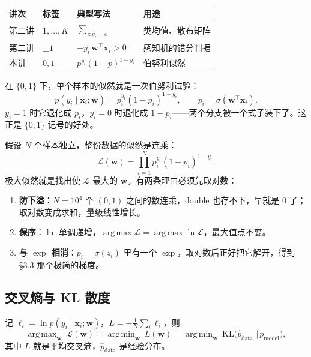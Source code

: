 \documentclass[11pt,a4paper,fontset=windows,zihao=-4]{ctexart}
\newcommand{\bw}{\mathbf{w}}
\newcommand{\bx}{\mathbf{x}}
\newcommand{\tp}{^{\top}}
\DeclareMathOperator*{\argmin}{arg\,min}
\DeclareMathOperator*{\argmax}{arg\,max}
\newcommand{\tabhead}{\sffamily\bfseries\color{navy}}
\begin{document}
\begin{center}
\small
\begin{tabular}{@{}llll@{}}
\toprule
\rowcolor{navy!7}
\tabhead 讲次 & \tabhead 标签 & \tabhead 典型写法 & \tabhead 用途\\
\midrule
第二讲 & $1,\dots,K$ & $\sum_{i:y_i=c}$ & 类均值、散布矩阵\\
第二讲 & $\pm1$ & $-y_i\,\bw\tp\bx_i>0$ & 感知机的错分判据\\
本讲 & $0,1$ & $p^{y_i}(1-p)^{1-y_i}$ & 伯努利似然\\
\bottomrule
\end{tabular}
\end{center}

在 $\{0,1\}$ 下，单个样本的似然就是一次伯努利试验：
\begin{equation}
  p(y_i\mid\bx_i;\bw)=p_i^{y_i}(1-p_i)^{1-y_i},\qquad p_i=\sigma(\bw\tp\bx_i).
  \label{eq:like}
\end{equation}
$y_i=1$ 时它退化成 $p_i$，$y_i=0$ 时退化成 $1-p_i$——两个分支被一个式子装下了。这正是 $\{0,1\}$ 记号的好处。

假设 $N$ 个样本独立，整份数据的似然是连乘：
\begin{equation}
  \mathcal{L}(\bw)=\prod_{i=1}^{N}p_i^{y_i}(1-p_i)^{1-y_i}.
  \label{eq:likeN}
\end{equation}
极大似然就是找出使 $\mathcal{L}$ 最大的 $\bw$。有两条理由必须先取对数：
\begin{enumerate}[label=(\arabic*),leftmargin=2.0em]
  \item \textbf{防下溢}：$N=10^{4}$ 个 $(0,1)$ 之间的数连乘，double 也存不下，早就是 $0$ 了；取对数变成求和，量级线性增长。
  \item \textbf{保序}：$\ln$ 单调递增，$\argmax\mathcal{L}=\argmax\ln\mathcal{L}$，最大值点不变。
  \item \textbf{与 $\exp$ 相消}：$p_i=\sigma(z_i)$ 里有一个 $\exp$，取对数后正好把它解开，得到 \S3.3 那个极简的梯度。
\end{enumerate}

\subsection{交叉熵与 KL 散度}

\begin{thm}
记 $\ell_i=\ln p(y_i\mid\bx_i;\bw)$，$L=-\frac1N\sum_i\ell_i$，则
\begin{equation}
  \argmax_{\bw}\ \mathcal{L}(\bw)
  =\argmin_{\bw}\ L(\bw)
  =\argmin_{\bw}\ \mathrm{KL}\bigl(\hat p_{\text{data}}\,\big\Vert\,p_{\text{model}}\bigr),
  \label{eq:equiv}
\end{equation}
其中 $L$ 就是平均交叉熵，$\hat p_{\text{data}}$ 是经验分布。
\end{thm}
\end{document}
